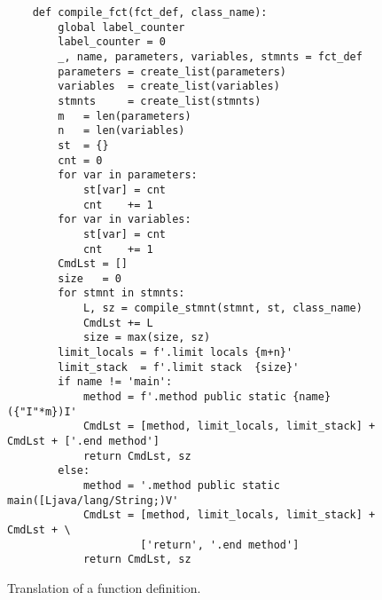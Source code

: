 \begin{figure}[!ht]
\centering
\begin{verbatim}
    def compile_fct(fct_def, class_name):
        global label_counter
        label_counter = 0
        _, name, parameters, variables, stmnts = fct_def
        parameters = create_list(parameters)
        variables  = create_list(variables)
        stmnts     = create_list(stmnts)
        m   = len(parameters)
        n   = len(variables)
        st  = {}
        cnt = 0
        for var in parameters:
            st[var] = cnt
            cnt    += 1
        for var in variables:
            st[var] = cnt
            cnt    += 1
        CmdLst = []
        size   = 0
        for stmnt in stmnts:
            L, sz = compile_stmnt(stmnt, st, class_name)
            CmdLst += L
            size = max(size, sz)
        limit_locals = f'.limit locals {m+n}'
        limit_stack  = f'.limit stack  {size}'
        if name != 'main':
            method = f'.method public static {name}({"I"*m})I'
            CmdLst = [method, limit_locals, limit_stack] + CmdLst + ['.end method']
            return CmdLst, sz
        else:
            method = '.method public static main([Ljava/lang/String;)V'
            CmdLst = [method, limit_locals, limit_stack] + CmdLst + \
                     ['return', '.end method']
            return CmdLst, sz
\end{verbatim}
\vspace*{-0.3cm}
\caption{Translation of a function definition.}
\label{fig:Compiler.ipynb:compile:fct}
\end{figure}

